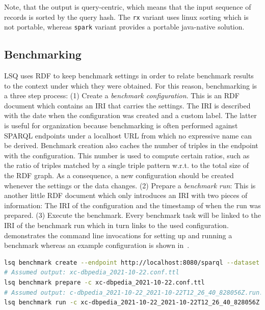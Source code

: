 Note, that the output is query-centric, which means that the input sequence of records is sorted by the query hash. The \texttt{rx} variant uses linux sorting which is not portable, whereas \texttt{spark} variant provides a portable java-native solution.

\subsection{Benchmarking}
LSQ uses RDF to keep benchmark settings in order to relate benchmark results to the context under which they were obtained.
For this reason, benchmarking is a three step process: (1) Create a \emph{benchmark configuration}. This is an RDF document which contains an IRI that carries the settings. The IRI is described with the date when the configuration was created and a custom label. The latter is useful for organization because benchmarking is often performed against SPARQL endpoints under a localhost URL from which no expressive name can be derived. Benchmark creation also caches the number of triples in the endpoint with the configuration. This number is used to compute certain ratios, such as the ratio of triples matched by a single triple pattern w.r.t. to the total size of the RDF graph.
As a consequence, a new configuration should be created whenever the settings or the data changes.
(2) Prepare a \emph{benchmark run}: This is another little RDF document which only introduces an IRI with two pieces of information: The IRI of the configuration and the timestamp of when the run was prepared.
(3) Execute the benchmark. Every benchmark task will be linked to the IRI of the benchmark run which in turn links to the used configuration.
 demonstrates the command line invocations for setting up and running a benchmark whereas an example configuration is shown in~.

\begin{lstlisting}[label=lst:lsq-cli-benchmark, caption=Example benchmark setup and execution, style=lst, language=bash, float=*]
lsq benchmark create --endpoint http://localhost:8080/sparql --dataset dbpedia
# Assumed output: xc-dbpedia_2021-10-22.conf.ttl
lsq benchmark prepare -c xc-dbpedia_2021-10-22.conf.ttl
# Assumed output: c-dbpedia_2021-10-22_2021-10-22T12_26_40_828056Z.run.ttl
lsq benchmark run -c xc-dbpedia_2021-10-22_2021-10-22T12_26_40_828056Z.run.ttl virtuoso.dbpedia.trig
\end{lstlisting}

